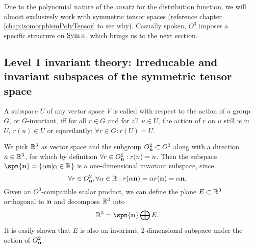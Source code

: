 Due to the polynomial nature of the ansatz for the distribution function, we will almost exclusively work with symmetric tensor spaces (reference chapter \ref{chap:isomorphismPolyTensor} to see why). Casually spoken, $O^3$ imposes a specific structure on $\operatorname{Sym}{n}$, which brings us to the next section.

\subsection{Level 1 invariant theory: Irreducable and invariant subspaces of the symmetric tensor space}
\begin{definition} A subspace $U$ of any vector space $V$ is called  with respect to the action of a group $G$, or $G$-invariant, iff for all $r\in G$ and for all $u\in U$, the action of $r$ on $u$ still is in $U$, $r(u)\in U$ or equivilantly: $\forall r\in G: r(U)=U$.	
\end{definition}

\begin{example}
	We pick $\mathbb{R}^3$ as vector space and the subgroup $O^2_{\mathbf{n}} \subset O^3$ along with a direction $n\in\mathbb{R}^3$, for which by definition $\forall r \in O^2_{\mathbf{n}}: r(n)=n$.
	Then the subspace $\spn{\vc{n}}= \{\alpha \vc{n}|\alpha\in\IR\}$ is a one-dimensional invariant subspace, since 
	\[\forall r \in O^2_{\mathbf{n}}, \forall \alpha\in\mathbb{R}: r(\alpha \mathbf{n}) = \alpha r(\mathbf{n}) = \alpha\mathbf{n}.\]
	Given an $O^3$-compatible scalar product, we can define the plane $E\subset\mathbb{R}^3$ orthogonal to $\mathbf{n}$ and decompose $\mathbb{R}^3$ into \[\IR^3 = \spn{\vc{n}}\bigoplus E.\] It is easily shown that $E$ is also an invariant, 2-dimensional subspace under the action of $O^2_{\mathbf{n}}$.
	
\end{example}

